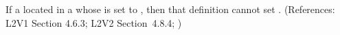 If a \Species located in a \Compartment whose  is
set to , then that \Species definition cannot set
.  (References: L2V1 Section 4.6.3; L2V2
Section~4.8.4; )
